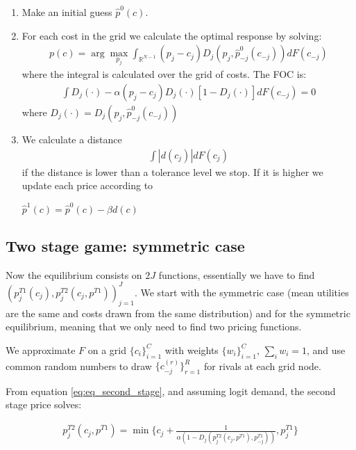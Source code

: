 \documentclass[12pt]{article}
\begin{document}
\begin{enumerate}
    \item Make an initial guess $\hat{p}^0(c)$. 
    \item For each cost in the grid we calculate the optimal response by solving: 
    \begin{align} %
        p(c) = \arg \max_{p_j} \int_{\mathbb{R}^{N-1}}^{} (p_j - c_j) D_j(p_j, \hat{p}^0_{-j}(c_{-j})) dF(c_{-j})
    \end{align}  
    where the integral is calculated over the grid of costs.
    The FOC is:  
    \begin{align} %
        \int D_j(\cdot) -\alpha  (p_j - c_j)  D_j(\cdot) [1-D_j(\cdot)] dF(c_{-j}) = 0 
    \end{align} 
    where $D_j(\cdot) = D_j(p_j, \hat{p}^0_{-j}(c_{-j}))$
    

    
    \item We calculate a distance 
    \begin{align} %
        \int | d(c_j) | dF(c_j)
    \end{align}
    if the distance is lower than a tolerance level we stop. If it is higher we update each price according to 

    $\hat{p}^1(c) = \hat{p}^0(c) - \beta d(c)$
    
\end{enumerate}

\subsection{Two stage game: symmetric case}

Now the equilibrium consists on $2J$ functions, essentially we have to find $(p_j^{T1}(c_j), p_j^{T2}(c_j, p^{T1}))_{j=1}^J$. We start with the symmetric case (mean utilities are the same and costs drawn from the same distribution) and for the symmetric equilibrium, meaning that we only need to find two pricing functions.


We approximate $F$ on a grid $\{c_i\}_{i=1}^C$ with weights $\{w_i\}_{i=1}^C$, $\sum_i w_i=1$, and use common random numbers to draw $\{c_{-j}^{(r)}\}_{r=1}^R$ for rivals at each grid node.

From equation \ref{eq:eq_second_stage}, and assuming logit demand, the second stage price solves: 

\begin{align}\label{eq:14} %
    p_j^{T2}(c_j, p^{T1}) = \min \{c_j+\frac{1}{\alpha   (1 -D_j(p_j^{T2}(c_j, p^{T1}), p_{-j}^{T1}))}, p_j^{T1}  \}
\end{align}
\end{document}
